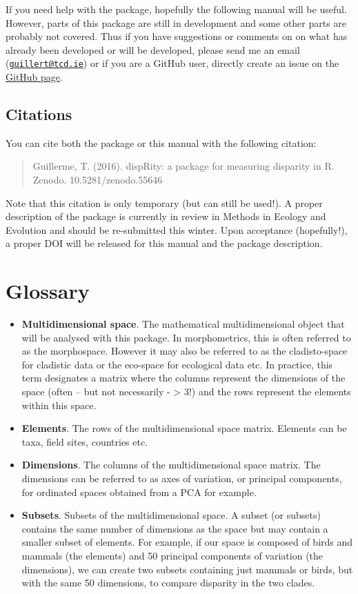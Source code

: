 \documentclass[]{book}
\theoremstyle{definition}
\theoremstyle{definition}
\theoremstyle{remark}
\begin{document}
If you need help with the package, hopefully the following manual will
be useful. However, parts of this package are still in development and
some other parts are probably not covered. Thus if you have suggestions
or comments on on what has already been developed or will be developed,
please send me an email
(\href{mailto:guillert@tcd.ie}{\nolinkurl{guillert@tcd.ie}}) or if you
are a GitHub user, directly create an issue on the
\href{https://github.com/TGuillerme/dispRity}{GitHub page}.

\section{Citations}\label{citations}

You can cite both the package or this manual with the following
citation:

\begin{quote}
Guillerme, T. (2016). dispRity: a package for measuring disparity in R.
Zenodo. 10.5281/zenodo.55646
\end{quote}

Note that this citation is only temporary (but can still be used!). A
proper description of the package is currently in review in Methods in
Ecology and Evolution and should be re-submitted this winter. Upon
acceptance (hopefully!), a proper DOI will be released for this manual
and the package description.

\chapter{Glossary}\label{glossary}

\begin{itemize}
\item
  \textbf{Multidimensional space}. The mathematical multidimensional
  object that will be analysed with this package. In morphometrics, this
  is often referred to as the morphospace. However it may also be
  referred to as the cladisto-space for cladistic data or the eco-space
  for ecological data etc. In practice, this term designates a matrix
  where the columns represent the dimensions of the space (often -- but
  not necessarily - \textgreater{} 3!) and the rows represent the
  elements within this space.
\item
  \textbf{Elements}. The rows of the multidimensional space matrix.
  Elements can be taxa, field sites, countries etc.
\item
  \textbf{Dimensions}. The columns of the multidimensional space matrix.
  The dimensions can be referred to as axes of variation, or principal
  components, for ordinated spaces obtained from a PCA for example.
\item
  \textbf{Subsets}. Subsets of the multidimensional space. A subset (or
  subsets) contains the same number of dimensions as the space but may
  contain a smaller subset of elements. For example, if our space is
  composed of birds and mammals (the elements) and 50 principal
  components of variation (the dimensions), we can create two subsets
  containing just mammals or birds, but with the same 50 dimensions, to
  compare disparity in the two clades.
\end{itemize}
\end{document}
